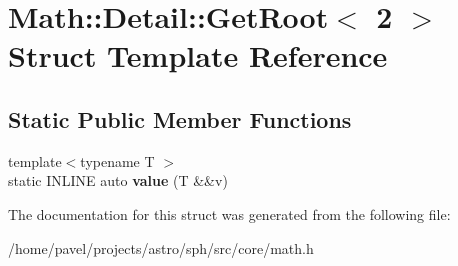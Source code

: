 \hypertarget{structMath_1_1Detail_1_1GetRoot_3_012_01_4}{}\section{Math\+:\+:Detail\+:\+:Get\+Root$<$ 2 $>$ Struct Template Reference}
\label{structMath_1_1Detail_1_1GetRoot_3_012_01_4}
\subsection*{Static Public Member Functions}
\begin{DoxyCompactItemize}
\item 
\hypertarget{structMath_1_1Detail_1_1GetRoot_3_012_01_4_a943ca011eed563515355541d221e8630}{}\label{structMath_1_1Detail_1_1GetRoot_3_012_01_4_a943ca011eed563515355541d221e8630} 
{\footnotesize template$<$typename T $>$ }\\static I\+N\+L\+I\+NE auto {\bfseries value} (T \&\&v)
\end{DoxyCompactItemize}


The documentation for this struct was generated from the following file\+:\begin{DoxyCompactItemize}
\item 
/home/pavel/projects/astro/sph/src/core/math.\+h\end{DoxyCompactItemize}
